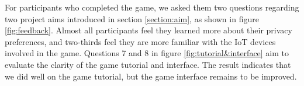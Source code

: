 \documentclass[msc,deptreport,ai]{infthesis}      %
\begin{document}
For participants who completed the game, we asked them two questions regarding two project aims introduced in section \ref{section:aim}, as shown in figure \ref{fig:feedback}. Almost all participants feel they learned more about their privacy preferences, and two-thirds feel they are more familiar with the IoT devices involved in the game. Questions 7 and 8 in figure \ref{fig:tutorial&interface} aim to evaluate the clarity of the game tutorial and interface. The result indicates that we did well on the game tutorial, but the game interface remains to be improved.

\begin{figure}[htbp]
\center
{}\hspace{-1pt}%
\end{figure}
\end{document}
